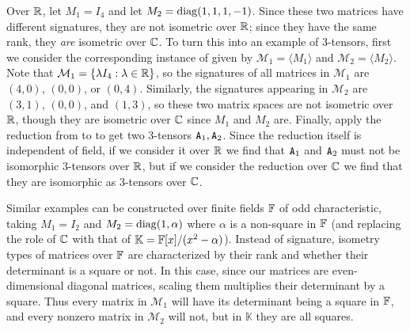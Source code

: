 \documentclass[11pt]{article}
\begin{document}
\begin{example} 
Over $\mathbb{R}$, let $M_1 = I_4$ and let $M_2 = \operatorname{diag}(1,1,1,-1)$. Since these two matrices have different signatures, they are not isometric over $\mathbb{R}$; since they have the same rank, they \emph{are} isometric over $\mathbb{C}$. To turn this into an example of 3-tensors, first we consider the corresponding instance of  given by $\mathcal{M}_1 = \langle M_1 \rangle$ and $\mathcal{M}_2 = \langle M_2 \rangle$. Note that $\mathcal{M}_1 = \{\lambda I_4 : \lambda \in \mathbb{R}\}$, so the signatures of all matrices in $\mathcal{M}_1$ are $(4,0)$, $(0,0)$, or $(0,4)$. Similarly, the signatures appearing in $\mathcal{M}_2$ are $(3,1)$, $(0,0)$, and $(1,3)$, so these two matrix spaces are not isometric over $\mathbb{R}$, though they are isometric over $\mathbb{C}$ since $M_1$ and $M_2$ are. Finally, apply the reduction from  to \ThreeTI \cite{FGS19} to get two 3-tensors $\mathtt{A}_1, \mathtt{A}_2$. Since the reduction itself is independent of field, if we consider it over $\mathbb{R}$ we find that $\mathtt{A}_1$ and $\mathtt{A}_2$ must not be isomorphic 3-tensors over $\mathbb{R}$, but if we consider the reduction over $\mathbb{C}$ we find that they are isomorphic as 3-tensors over $\mathbb{C}$.

Similar examples can be constructed over finite fields $\mathbb{F}$ of odd characteristic, taking $M_1 = I_2$ and $M_2 = \operatorname{diag}(1,\alpha)$ where $\alpha$ is a non-square in $\mathbb{F}$ (and replacing the role of $\mathbb{C}$ with that of $\mathbb{K} = \mathbb{F}[x] / (x^2 - \alpha)$). Instead of signature, isometry types of matrices over $\mathbb{F}$ are characterized by their rank and whether their determinant is a square or not. In this case, since our matrices are even-dimensional diagonal matrices, scaling them multiplies their determinant by a square. Thus every matrix in $\mathcal{M}_1$ will have its determinant being a square in $\mathbb{F}$, and every nonzero matrix in $\mathcal{M}_2$ will not, but in $\mathbb{K}$ they are all squares.
\end{example}
\end{document}
